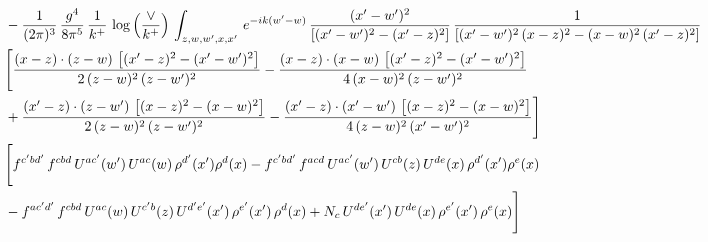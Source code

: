 \documentclass[9pt]{article}
\numberwithin{equation}{section}
\begin{document}
\begin{align}
& -\frac{1}{(2\pi)^{3}}\, \frac{g^{4}}{8\pi^{5}}\,\frac{1}{k^{+}}\,\log{\left(\frac{\vee}{k^{+}}\right)}\,\int_{z,w,w^{\prime},x,x'}\, e^{-ik(w^{\prime}-w)}\, \frac{(x'-w')^{2}}{\left[(x'-w')^{2}-(x'-z)^{2}\right]}\, \frac{1}{\left[(x'-w')^{2}\, (x-z)^{2} - (x-w)^{2}\, (x'-z)^{2}\right]}  \notag \\ & \Bigg[\frac{(x-z)\cdot (z-w)\, \left[(x'-z)^{2}-(x'-w')^{2}\right]}{2\, (z-w)^{2}\, (z-w')^{2}}  - \frac{(x-z)\cdot (x-w)\,\left[(x'-z)^{2}-(x'-w')^{2}\right] }{4\,(x-w)^{2}\,(z-w')^{2}}\notag \\ & +\frac{(x'-z)\cdot (z-w')\, \left[(x-z)^{2}-(x-w)^{2}\right]}{2\, (z-w)^{2}\, (z-w')^{2}}-\frac{(x'-z)\cdot (x'-w')\, \left[(x-z)^{2}-(x-w)^{2}\right]}{4\, (z-w)^{2}\,(x'-w')^{2}}\Bigg]\notag \\ & \Bigg[f^{c'bd'}\,f^{cbd}\, U^{ac'}(w')\,U^{ac}(w)\,\rho^{d'}(x')\rho^{d}(x)- f^{c'bd'}\,f^{acd}\,U^{ac'}(w')\,U^{cb}(z)\,U^{de}(x)\,\rho^{d'}(x')\rho^{e}(x) \notag \\ & -f^{ac'd'}\,f^{cbd}\,U^{ac}(w)\,U^{c'b}(z)\,U^{d'e'}(x')\,\rho^{e'}(x')\,\rho^{d}(x) +N_{c}\,U^{de'}(x')\,U^{de}(x)\,\rho^{e'}(x')\,\rho^{e}(x)\Bigg]
\end{align}
\end{document}
